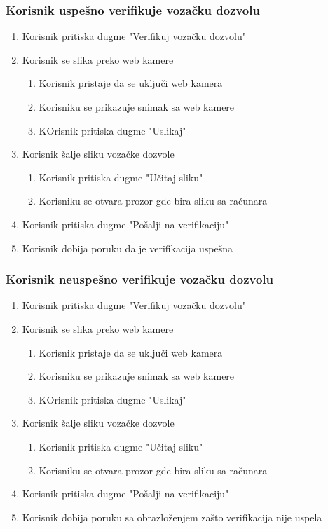 \documentclass[12pt]{article}
\begin{document}
\subsubsection{Korisnik uspešno verifikuje vozačku dozvolu}
\begin{enumerate}
  \item Korisnik pritiska dugme "Verifikuj vozačku dozvolu"
  \item Korisnik se slika preko web kamere
  \begin{enumerate}
     \item Korisnik pristaje da se uključi web kamera
     \item Korisniku se prikazuje snimak sa web kamere
     \item KOrisnik pritiska dugme "Uslikaj"
  \end{enumerate}
  \item Korisnik šalje sliku vozačke dozvole
  \begin{enumerate}
     \item Korisnik pritiska dugme "Učitaj sliku"
     \item Korisniku se otvara prozor gde bira sliku sa računara
  \end{enumerate}
  \item Korisnik pritiska dugme "Pošalji na verifikaciju"
  \item Korisnik dobija poruku da je verifikacija uspešna
\end{enumerate}
\subsubsection{Korisnik neuspešno verifikuje vozačku dozvolu}
\begin{enumerate}
  \item Korisnik pritiska dugme "Verifikuj vozačku dozvolu"
  \item Korisnik se slika preko web kamere
  \begin{enumerate}
     \item Korisnik pristaje da se uključi web kamera
     \item Korisniku se prikazuje snimak sa web kamere
     \item KOrisnik pritiska dugme "Uslikaj"
  \end{enumerate}
  \item Korisnik šalje sliku vozačke dozvole
  \begin{enumerate}
     \item Korisnik pritiska dugme "Učitaj sliku"
     \item Korisniku se otvara prozor gde bira sliku sa računara
  \end{enumerate}
  \item Korisnik pritiska dugme "Pošalji na verifikaciju"
  \item Korisnik dobija poruku sa obrazloženjem zašto verifikacija nije uspela
\end{enumerate}
\end{document}
